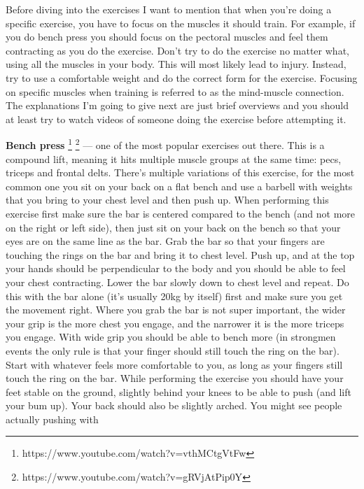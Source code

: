 \documentclass[openany, 12pt]{book}
\begin{document}
        Before diving into the exercises I want to mention that when you're doing a specific exercise, you have to focus on the muscles it should train. For example, if you do bench press
        you should focus on the pectoral muscles and feel them contracting as you do the exercise. Don't try to do the exercise no matter what, using all the muscles in
        your body. This will most likely lead to injury. Instead, try to use a comfortable weight and do the correct form for the exercise.
        Focusing on specific muscles when training is referred to as the mind-muscle connection. The explanations I'm going to give next are just
        brief overviews and you should at least try to watch videos of someone doing the exercise before attempting it.

        \textbf{Bench press}
        \footnote{https://www.youtube.com/watch?v=vthMCtgVtFw}
        \footnote{https://www.youtube.com/watch?v=gRVjAtPip0Y}
        --- one of the most popular exercises out there. This is a compound lift, meaning it hits multiple muscle groups at the same time: pecs, triceps and frontal delts.
        There's multiple variations of this exercise, for the most common one you sit on your back on a flat bench and use a barbell with weights that you bring to your chest level
        and then push up. When performing this exercise first make sure the bar is centered compared to the bench (and not more on the right or left side), then just sit on your back on the bench
        so that your eyes are on the same line as the bar. Grab the bar so that your fingers are touching the rings on the bar and bring it to chest level. Push up, and at the top your hands should be
        perpendicular to the body and you should be able to feel your chest contracting. Lower the bar slowly down to chest level and repeat.
        Do this with the bar alone (it's usually 20kg by itself) first and make sure you get the movement right.
        Where you grab the bar is not super important, the wider your grip is the more chest you engage, and the narrower it is the more triceps you engage. With wide grip you should be able to
        bench more (in strongmen events the only rule is that your finger should still touch the ring on the bar). Start with whatever feels more comfortable to you, as long as your fingers still
        touch the ring on the bar. While performing the exercise you should have your feet stable on the ground, slightly behind your knees 
        to be able to push (and lift your bum up). Your back should also be slightly arched.
        You might see people actually pushing with
\end{document}
